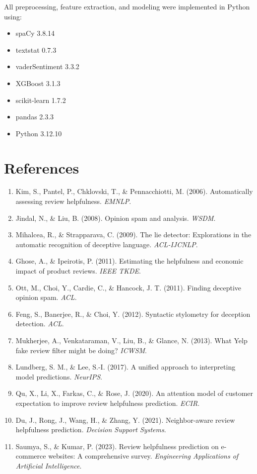 \documentclass[12pt]{article}
\begin{document}
All preprocessing, feature extraction, and modeling were implemented in Python using:

\begin{itemize}
\item spaCy 3.8.14
\item textstat 0.7.3
\item vaderSentiment 3.3.2
\item XGBoost 3.1.3
\item scikit-learn 1.7.2
\item pandas 2.3.3
\item Python 3.12.10
\end{itemize}

\section*{References}

\begin{enumerate}
\item Kim, S., Pantel, P., Chklovski, T., \& Pennacchiotti, M. (2006). Automatically assessing review helpfulness. \emph{EMNLP}.
\item Jindal, N., \& Liu, B. (2008). Opinion spam and analysis. \emph{WSDM}.
\item Mihalcea, R., \& Strapparava, C. (2009). The lie detector: Explorations in the automatic recognition of deceptive language. \emph{ACL-IJCNLP}.
\item Ghose, A., \& Ipeirotis, P. (2011). Estimating the helpfulness and economic impact of product reviews. \emph{IEEE TKDE}.
\item Ott, M., Choi, Y., Cardie, C., \& Hancock, J. T. (2011). Finding deceptive opinion spam. \emph{ACL}.
\item Feng, S., Banerjee, R., \& Choi, Y. (2012). Syntactic stylometry for deception detection. \emph{ACL}.
\item Mukherjee, A., Venkataraman, V., Liu, B., \& Glance, N. (2013). What Yelp fake review filter might be doing? \emph{ICWSM}.
\item Lundberg, S. M., \& Lee, S.-I. (2017). A unified approach to interpreting model predictions. \emph{NeurIPS}.
\item Qu, X., Li, X., Farkas, C., \& Rose, J. (2020). An attention model of customer expectation to improve review helpfulness prediction. \emph{ECIR}.
\item Du, J., Rong, J., Wang, H., \& Zhang, Y. (2021). Neighbor-aware review helpfulness prediction. \emph{Decision Support Systems}.
\item Saumya, S., \& Kumar, P. (2023). Review helpfulness prediction on e-commerce websites: A comprehensive survey. \emph{Engineering Applications of Artificial Intelligence}.
\end{enumerate}
\end{document}
